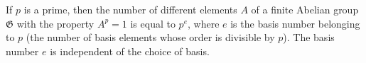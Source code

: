 If $p$ is a prime, then the number of different elements $A$ of a finite Abelian group $\mathfrak{G}$ with the property $A^p = 1$ is equal to $p^e$, where $e$ is the basis number belonging to $p$ (the number of basis elements whose order is divisible by $p$). The basis number $e$ is independent of the choice of basis.

